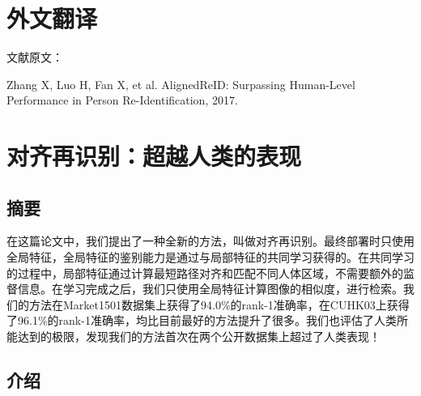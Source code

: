 \chapter{外文翻译}

{
  \setlength{\parindent}{0em}

  文献原文：

  Zhang X, Luo H, Fan X, et al. AlignedReID: Surpassing Human-Level Performance in Person Re-Identification, 2017. \par

}

\vspace{2em}

{
  \renewcommand{\cleardoublepage}{}
  \renewcommand{\clearpage}{}
  \titleformat{\chapter}[block]{\sanhao\songti\bfseries\filcenter}{}{0em}{}{}
  \chapter*{对齐再识别：超越人类的表现}
}

\section*{摘要}

在这篇论文中，我们提出了一种全新的方法，叫做对齐再识别。最终部署时只使用全局特征，全局特征的鉴别能力是通过与局部特征的共同学习获得的。在共同学习的过程中，局部特征通过计算最短路径对齐和匹配不同人体区域，不需要额外的监督信息。在学习完成之后，我们只使用全局特征计算图像的相似度，进行检索。我们的方法在Market1501数据集上获得了94.0\%的rank-1准确率，在CUHK03上获得了96.1\%的rank-1准确率，均比目前最好的方法提升了很多。我们也评估了人类所能达到的极限，发现我们的方法首次在两个公开数据集上超过了人类表现！

\section{介绍}

